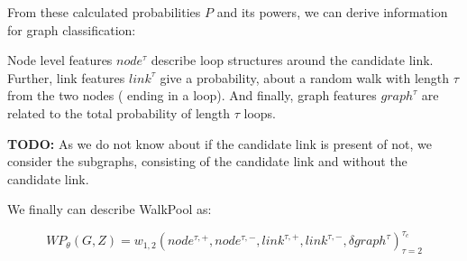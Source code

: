 From these calculated probabilities $P$ and its powers, we can derive information for 
graph classification:

Node level features $node^{\tau}$ describe loop structures around the candidate link.
Further, link features $link^{\tau}$ give a probability, about a random walk with length
$\tau$ from the two nodes ( ending in a loop). And finally, graph features $graph^{\tau}$ are related to the total
probability of length $\tau$ loops.

\textbf{TODO:}
As we do not know about if the candidate link is present of not, we consider the subgraphs,
consisting of the candidate link and without the candidate link.


We finally can describe WalkPool as:

\begin{equation}
    WP_{\theta}(G, Z) =w_{1,2}(node^{\tau, +}, node^{\tau, -}, link^{\tau, +}, link^{\tau, -}, \delta graph^{\tau})^{\tau_c}_{\tau = 2}
\end{equation}

